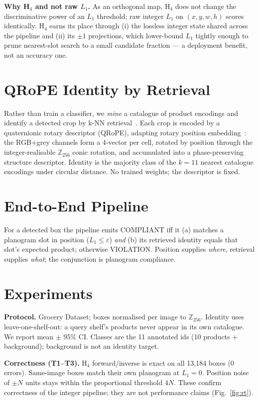 \documentclass[10pt,journal,compsoc]{IEEEtran}
\begin{document}
\noindent\textbf{Why H$_4$ and not raw $L_1$.} As an orthogonal map, H$_4$ does not
change the discriminative power of an $L_1$ threshold; raw integer $L_1$ on
$(x,y,w,h)$ scores identically. H$_4$ earns its place through (i) the lossless
integer state shared across the pipeline and (ii) its $\pm1$ projections, which
lower-bound $L_1$ tightly enough to prune nearest-slot search to a small candidate
fraction --- a deployment benefit, not an accuracy one.

\section{QRoPE Identity by Retrieval}
Rather than train a classifier, we \emph{mine} a catalogue of product encodings and
identify a detected crop by k-NN retrieval~\cite{cover1967}. Each crop is encoded by a
quaternionic rotary descriptor (QRoPE), adapting rotary position embedding~\cite{su2024}:
the RGB+grey channels form a 4-vector per cell, rotated
by position through the integer-realisable $\mathbb{Z}_{256}$ conic rotation, and
accumulated into a phase-preserving structure descriptor. Identity is the majority
class of the $k{=}11$ nearest catalogue encodings under circular distance. No
trained weights; the descriptor is fixed.

\section{End-to-End Pipeline}
For a detected box the pipeline emits COMPLIANT iff it (a) matches a planogram slot
in position ($L_1\le\varepsilon$) \emph{and} (b) its retrieved identity equals that
slot's expected product; otherwise VIOLATION. Position supplies \emph{where},
retrieval supplies \emph{what}; the conjunction is planogram compliance.

\section{Experiments}
\textbf{Protocol.} Grocery Dataset; boxes normalised per image to $\mathbb{Z}_{256}$.
Identity uses leave-one-shelf-out: a query shelf's products never appear in its own
catalogue. We report mean $\pm$ 95\% CI. Classes are the 11 annotated ids
(10 products + background); background is not an identity target.

\textbf{Correctness (T1--T3).} H$_4$ forward/inverse is exact on all 13{,}184 boxes
(0 errors). Same-image boxes match their own planogram at $L_1{=}0$. Position noise
of $\pm N$ units stays within the proportional threshold $4N$. These confirm
correctness of the integer pipeline; they are not performance claims
(Fig.~\ref{fig:rt}).
\end{document}
